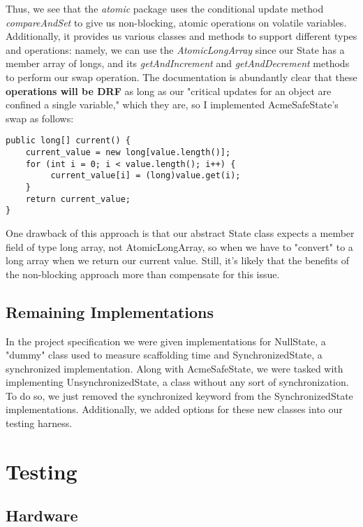 Thus, we see that the \emph{atomic} package uses the conditional update method \emph{compareAndSet} 
to give us non-blocking, atomic operations on volatile variables. Additionally, 
it provides us various classes and methods to support different types and operations: namely, 
we can use the \emph{AtomicLongArray} since our State has a member array of longs, and 
its \emph{getAndIncrement} and \emph{getAndDecrement} methods to perform our swap operation. 
The documentation is abundantly clear that these \textbf{operations will be DRF} as long as
our "critical updates for an object are confined a single variable," which they are, so I implemented AcmeSafeState's 
swap as follows:

\begin{verbatim}
public long[] current() {
    current_value = new long[value.length()];
    for (int i = 0; i < value.length(); i++) {
         current_value[i] = (long)value.get(i);
    }
    return current_value;
}
\end{verbatim}

One drawback of this approach is that our abstract State class expects a 
member field of type long array, not AtomicLongArray, so when we have to 
"convert" to a long array when we return our current value. Still, it's likely
that the benefits of the non-blocking approach more than compensate for this issue.

\subsection{Remaining Implementations}

In the project specification we were given implementations for NullState, a "dummy" class
used to measure scaffolding time and SynchronizedState, a synchronized implementation. Along with AcmeSafeState, 
we were tasked with implementing UnsynchronizedState, a class without any sort of synchronization. To do so,
we just removed the synchronized keyword from the SynchronizedState implementations. Additionally,
we added options for these new classes into our testing harness. 

\section{Testing}

\subsection{Hardware}

